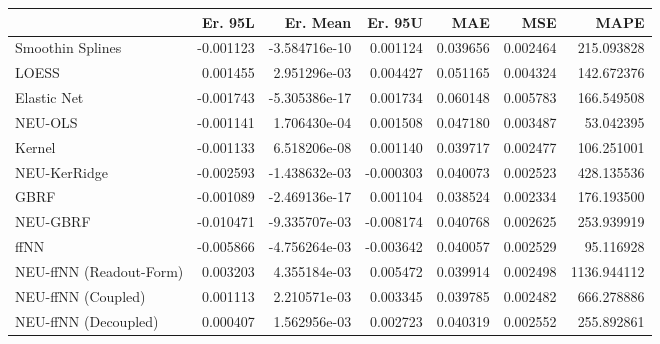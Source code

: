 \begin{tabular}{lrrrrrr}
\toprule
{} &   Er. 95L &      Er. Mean &   Er. 95U &       MAE &       MSE &         MAPE \\
\midrule
Smoothin Splines        & -0.001123 & -3.584716e-10 &  0.001124 &  0.039656 &  0.002464 &   215.093828 \\
LOESS                   &  0.001455 &  2.951296e-03 &  0.004427 &  0.051165 &  0.004324 &   142.672376 \\
Elastic Net             & -0.001743 & -5.305386e-17 &  0.001734 &  0.060148 &  0.005783 &   166.549508 \\
NEU-OLS                 & -0.001141 &  1.706430e-04 &  0.001508 &  0.047180 &  0.003487 &    53.042395 \\
Kernel                  & -0.001133 &  6.518206e-08 &  0.001140 &  0.039717 &  0.002477 &   106.251001 \\
NEU-KerRidge            & -0.002593 & -1.438632e-03 & -0.000303 &  0.040073 &  0.002523 &   428.135536 \\
GBRF                    & -0.001089 & -2.469136e-17 &  0.001104 &  0.038524 &  0.002334 &   176.193500 \\
NEU-GBRF                & -0.010471 & -9.335707e-03 & -0.008174 &  0.040768 &  0.002625 &   253.939919 \\
ffNN                    & -0.005866 & -4.756264e-03 & -0.003642 &  0.040057 &  0.002529 &    95.116928 \\
NEU-ffNN (Readout-Form) &  0.003203 &  4.355184e-03 &  0.005472 &  0.039914 &  0.002498 &  1136.944112 \\
NEU-ffNN (Coupled)      &  0.001113 &  2.210571e-03 &  0.003345 &  0.039785 &  0.002482 &   666.278886 \\
NEU-ffNN (Decoupled)    &  0.000407 &  1.562956e-03 &  0.002723 &  0.040319 &  0.002552 &   255.892861 \\
\bottomrule
\end{tabular}
